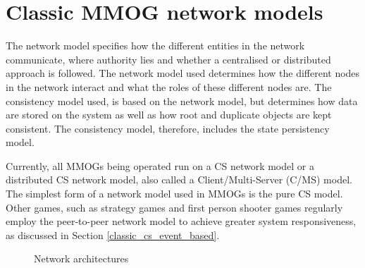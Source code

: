 \documentclass[10pt,a4paper,journal,cspaper,compsoc]{IEEEtran}
\begin{document}
\section{Classic MMOG network models}
\label{classic_network_models}

The network model specifies how the different entities in the network communicate, where authority lies and whether a centralised or distributed
approach is followed. The network model used determines how the different nodes in the network interact and what the roles of these different nodes
are. The consistency model used, is based on the network model, but determines how data are stored on the system as well as how root and duplicate
objects are kept consistent. The consistency model, therefore, includes the state persistency model.

Currently, all MMOGs being operated run on a \ac{CS} network model or a distributed \ac{CS} network model, also called a Client/Multi-Server (C/MS)
model. The simplest form of a network model used in MMOGs is the pure \ac{CS} model. Other games, such as strategy games and first person shooter
games regularly employ the peer-to-peer network model to achieve greater system responsiveness, as discussed in Section \ref{classic_cs_event_based}.

\begin{figure}[htbp]
\centering
\caption{Network architectures}
\end{figure}
\end{document}
